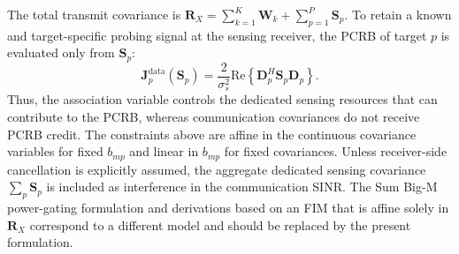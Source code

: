 \documentclass[12pt,a4paper]{article}
\newcommand{\mat}[1]{\mathbf{#1}}
\newcommand{\Real}{\text{Re}}
\begin{document}
The total transmit covariance is $\mat{R}_X=\sum_{k=1}^{K}\mat{W}_k+\sum_{p=1}^{P}\mat{S}_p$. To retain a known and target-specific probing signal at the sensing receiver, the PCRB of target $p$ is evaluated only from $\mat{S}_p$:
\begin{equation}\label{eq:clustered-fim}
 \mat{J}_p^{\mathrm{data}}(\mat{S}_p)
 =\frac{2}{\sigma_s^2}\Real\!\left\{\mat{D}_{p}^{H}\mat{S}_p\mat{D}_{p}\right\}.
\end{equation}
Thus, the association variable controls the dedicated sensing resources that can contribute to the PCRB, whereas communication covariances do not receive PCRB credit. The constraints above are affine in the continuous covariance variables for fixed $b_{mp}$ and linear in $b_{mp}$ for fixed covariances. Unless receiver-side cancellation is explicitly assumed, the aggregate dedicated sensing covariance $\sum_p\mat{S}_p$ is included as interference in the communication SINR. The Sum Big-M power-gating formulation and derivations based on an FIM that is affine solely in $\mat{R}_X$ correspond to a different model and should be replaced by the present formulation.
\end{document}
